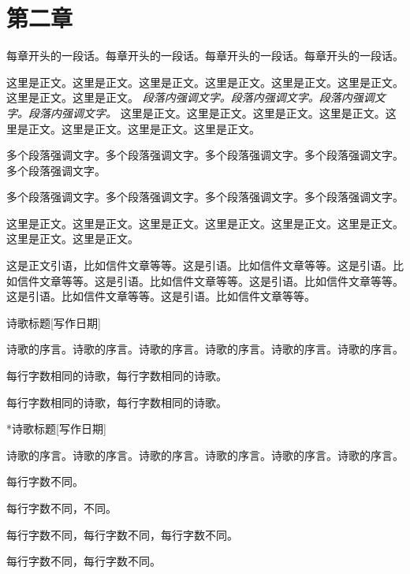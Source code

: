\documentclass[../../dazhuan.tex]{subfiles}
\begin{document}
\chapter*{第二章}

\begin{pref}
	每章开头的一段话。每章开头的一段话。每章开头的一段话。每章开头的一段话。	
\end{pref}

这里是正文。这里是正文。这里是正文。这里是正文。这里是正文。这里是正文。这里是正文。这里是正文。
\emph{段落内强调文字。段落内强调文字。段落内强调文字。段落内强调文字。}
这里是正文。这里是正文。这里是正文。这里是正文。这里是正文。这里是正文。这里是正文。这里是正文。

\begin{xemph}
	多个段落强调文字。多个段落强调文字。多个段落强调文字。多个段落强调文字。多个段落强调文字。
	
	多个段落强调文字。多个段落强调文字。多个段落强调文字。多个段落强调文字。
\end{xemph}


这里是正文。这里是正文。这里是正文。这里是正文。这里是正文。这里是正文。这里是正文。这里是正文。

\begin{xquote}
	这是正文引语，比如信件文章等等。这是引语。比如信件文章等等。这是引语。比如信件文章等等。这是引语。比如信件文章等等。这是引语。比如信件文章等等。这是引语。比如信件文章等等。这是引语。比如信件文章等等。
\end{xquote}

\newpage
\begin{poem}{诗歌标题}[写作日期]
	\begin{xpref}
		诗歌的序言。诗歌的序言。诗歌的序言。诗歌的序言。诗歌的序言。诗歌的序言。
	\end{xpref}
	
	每行字数相同的诗歌，每行字数相同的诗歌。
	
	每行字数相同的诗歌，每行字数相同的诗歌。	
\end{poem}

\begin{poem}*{诗歌标题}[写作日期]
	\begin{xpref}
		诗歌的序言。诗歌的序言。诗歌的序言。诗歌的序言。诗歌的序言。诗歌的序言。
	\end{xpref}
	
	每行字数不同。
	
	每行字数不同，不同。
	
	每行字数不同，每行字数不同，每行字数不同。
	
	每行字数不同，每行字数不同。	
\end{poem}
\end{document}
